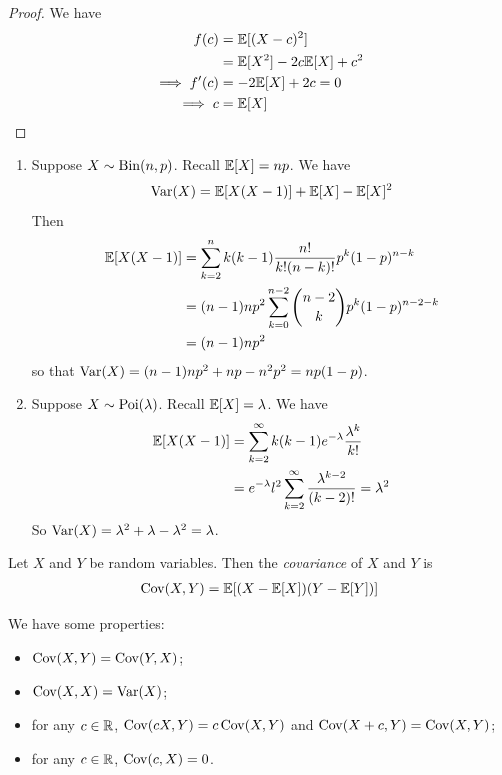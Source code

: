 \documentclass{../template/note}
\begin{document}
    \begin{proof}
        We have
        \begin{align*}
            f(c) &= \mathbb E[(X-c)^2] \\
            &= \mathbb E[X^2] - 2c\mathbb E[X] + c^2 \\
            \implies f'(c) &= -2\mathbb E[X] + 2c = 0 \\
            \implies c &= \mathbb E[X]
        \end{align*}
    \end{proof}
    
    \begin{example}
        \begin{enumerate}[label=\protect\circled{\arabic*}]
            \item Suppose \(X \sim \operatorname{Bin}(n, p)\). Recall \(\mathbb E[X] = np\). We have
            \begin{align*}
                \operatorname{Var}(X) = \mathbb E[X(X-1)] + \mathbb E[X] - \mathbb E[X]^2
            \end{align*}
            Then
            \begin{align*}
                \mathbb E[X(X-1)] &= \sum_{k=2}^n k(k-1) \frac{n!}{k!(n-k)!}p^k(1-p)^{n-k} \\
                &= (n-1)np^2 \sum_{k=0}^{n-2} \binom{n-2}{k} p^k (1-p)^{n-2-k} \\
                &= (n-1)np^2
            \end{align*}
            so that \(\operatorname{Var}(X) = (n-1)np^2 + np - n^2p^2 = np(1-p)\).
            \item Suppose \(X \sim \operatorname{Poi}(\lambda)\). Recall \(\mathbb E[X] = \lambda\). We have
            \begin{align*}
                \mathbb E[X(X-1)] &= \sum_{k=2}^\infty k(k-1) e^{-\lambda}\frac{\lambda^k}{k!} \\
                &= e^{-\lambda}l^2 \sum_{k=2}^\infty \frac{\lambda^{k-2}}{(k-2)!} = \lambda^2
            \end{align*}
            So \(\operatorname{Var}(X) = \lambda^2 + \lambda - \lambda^2 = \lambda\).
        \end{enumerate}
    \end{example}
    
    \begin{definition}
        Let \(X\) and \(Y\) be random variables. Then the \emph{covariance} of \(X\) and \(Y\) is
        \begin{align*}
            \operatorname{Cov}(X, Y) = \mathbb E[(X-\mathbb E[X])(Y-\mathbb E[Y])]
        \end{align*}
    \end{definition}
    We have some properties:
    \begin{itemize}
        \item \(\operatorname{Cov}(X, Y) = \operatorname{Cov}(Y, X)\);
        \item \(\operatorname{Cov}(X, X) = \operatorname{Var}(X)\);
        \item for any \(c \in \mathbb R\), \(\operatorname{Cov}(cX, Y) = c\operatorname{Cov}(X, Y)\) and \(\operatorname{Cov}(X + c, Y) = \operatorname{Cov}(X, Y)\);
        \item for any \(c \in \mathbb R\), \(\operatorname{Cov}(c, X) = 0\).
    \end{itemize}
    
\end{document}
